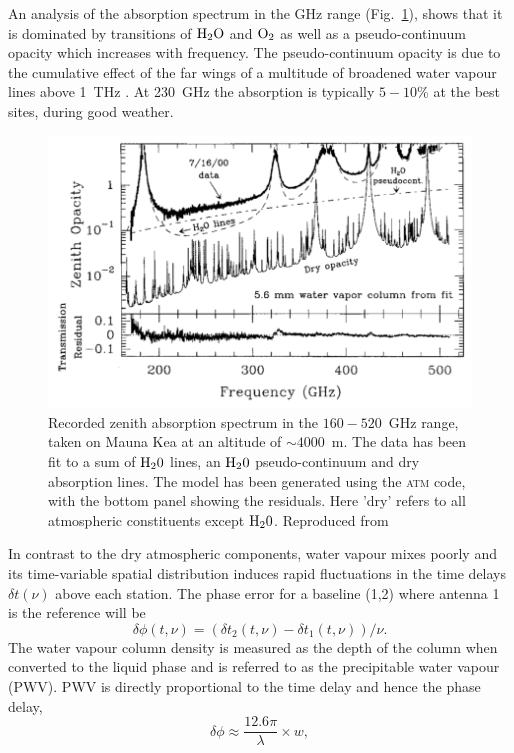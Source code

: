 An analysis of the absorption spectrum in the GHz range (Fig.~\ref{fig:absorption}), shows that it is dominated by transitions of $\rm H_2O$ and $\rm O_2$ as well as a pseudo-continuum opacity which increases with frequency. The pseudo-continuum opacity is due to the cumulative effect of the far wings of a multitude of broadened water vapour lines above 1~THz \citep{Carilli_1999}. At 230~GHz the absorption is typically $5-10$\% at the best sites, during good weather. 

\begin{figure}
\begin{center}
\includegraphics[width=\columnwidth]{Images/absorption}
\caption{Recorded zenith absorption spectrum in the $160-520$~GHz range, taken on Mauna Kea at an altitude of $\sim 4000$~m. The data has been fit to a sum of $\rm H_20$ lines, an $\rm H_20$ pseudo-continuum and dry absorption lines. The model has been generated using the \textsc{atm} code, with the bottom panel showing the residuals. Here 'dry' refers to all atmospheric constituents except $\rm H_20$. Reproduced from \citet{Pardo_2001} \label{fig:absorption}
}
\end{center}
\end{figure}

In contrast to the dry atmospheric components, water vapour mixes poorly and its time-variable spatial distribution induces rapid fluctuations in the time delays $\delta t (\nu)$ above each station. The phase error for a baseline (1,2) where antenna 1 is the reference will be
\begin{equation}
\delta \phi(t, \nu) = (\delta t_2(t, \nu) - \delta t_1(t, \nu))/\nu.
\end{equation}
The water vapour column density is measured as the depth of the column when converted to the liquid phase and is referred to as the precipitable water vapour (PWV). PWV is directly proportional to the time delay and hence the phase delay, 
\begin{equation}
\delta\phi \approx \frac{12.6\pi}{\lambda} \times w, 
\end{equation}\label{eq:phi-pwv}

